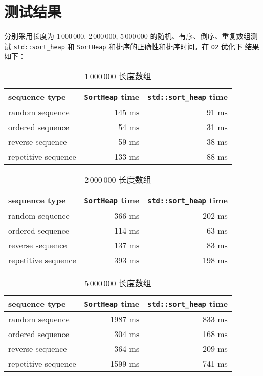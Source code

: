 \documentclass[UTF8, 12pt]{ctexart}
\begin{document}
\section{测试结果}
分别采用长度为 1\,000\,000, 2\,000\,000, 5\,000\,000 的随机、有序、倒序、重复数组测试 
\verb|std::sort_heap| 和 \verb|SortHeap| 和排序的正确性和排序时间。在 \verb|O2| 优化下
结果如下：
\begin{table}[hp]
  \centering
  \begin{tabular}{|l|r|r|}
    \hline
    sequence type       & \verb|SortHeap| time & \verb|std::sort_heap| time \\ \hline
    random sequence     & 145 ms               & 91 ms                      \\ \hline
    ordered sequence    & 54 ms                & 31 ms                      \\ \hline
    reverse sequence    & 59 ms                & 38 ms                      \\ \hline
    repetitive sequence & 133 ms               & 88 ms                      \\ \hline
  \end{tabular}
  \caption{1\,000\,000 长度数组}
\end{table}
\begin{table}[hp]
  \centering
  \begin{tabular}{|l|r|r|}
    \hline
    sequence type       & \verb|SortHeap| time & \verb|std::sort_heap| time \\ \hline
    random sequence     & 366 ms               & 202 ms                     \\ \hline
    ordered sequence    & 114 ms               & 63 ms                      \\ \hline
    reverse sequence    & 137 ms               & 83 ms                      \\ \hline
    repetitive sequence & 393 ms               & 198 ms                     \\ \hline
  \end{tabular}
  \caption{2\,000\,000 长度数组}
\end{table}
\begin{table}[hp]
  \centering
  \begin{tabular}{|l|r|r|}
    \hline
    sequence type       & \verb|SortHeap| time & \verb|std::sort_heap| time \\ \hline
    random sequence     & 1987 ms              & 833 ms                     \\ \hline
    ordered sequence    & 304 ms               & 168 ms                     \\ \hline
    reverse sequence    & 364 ms               & 209 ms                     \\ \hline
    repetitive sequence & 1599 ms              & 741 ms                     \\ \hline
  \end{tabular}
  \caption{5\,000\,000 长度数组}
\end{table}
\end{document}
